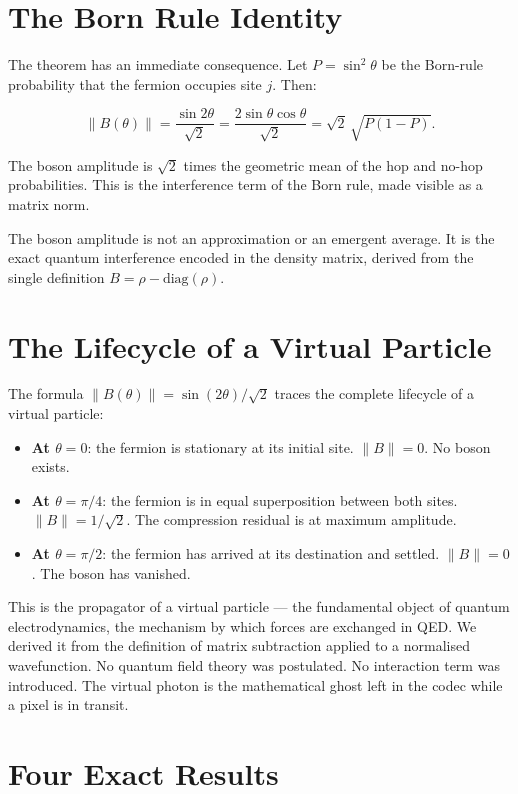 \section{The Born Rule Identity}

The theorem has an immediate consequence. Let $P = \sin^2\theta$ be
the Born-rule probability that the fermion occupies site $j$. Then:

\[
\|B(\theta)\| = \frac{\sin 2\theta}{\sqrt{2}}
= \frac{2\sin\theta\cos\theta}{\sqrt{2}}
= \sqrt{2}\,\sqrt{P(1-P)}.
\]

The boson amplitude is $\sqrt{2}$ times the geometric mean of the
hop and no-hop probabilities. This is the interference term of the Born
rule, made visible as a matrix norm.

The boson amplitude is not an approximation or an emergent average. It
is the exact quantum interference encoded in the density matrix, derived
from the single definition $B = \rho - \mathrm{diag}(\rho)$.

\section{The Lifecycle of a Virtual Particle}

The formula $\|B(\theta)\| = \sin(2\theta)/\sqrt{2}$ traces the complete
lifecycle of a virtual particle:

\begin{itemize}
    \item \textbf{At $\theta = 0$}: the fermion is stationary at its
    initial site. $\|B\| = 0$. No boson exists.
    \item \textbf{At $\theta = \pi/4$}: the fermion is in equal
    superposition between both sites. $\|B\| = 1/\sqrt{2}$. The
    compression residual is at maximum amplitude.
    \item \textbf{At $\theta = \pi/2$}: the fermion has arrived at its
    destination and settled. $\|B\| = 0$. The boson has vanished.
\end{itemize}

This is the propagator of a virtual particle --- the fundamental object
of quantum electrodynamics, the mechanism by which forces are exchanged
in QED. We derived it from the definition of matrix subtraction applied
to a normalised wavefunction. No quantum field theory was postulated. No
interaction term was introduced. The virtual photon is the mathematical
ghost left in the codec while a pixel is in transit.

\section{Four Exact Results}

